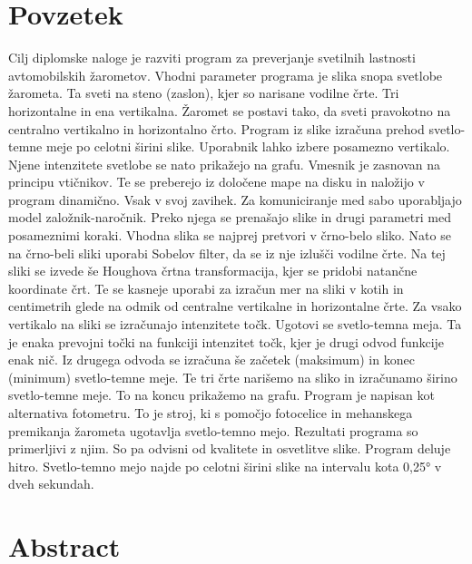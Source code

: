 \documentclass[oneside, a4paper, 12pt]{book}
\newcommand{\clearemptydoublepage}{\newpage{\pagestyle{empty}\cleardoublepage}}
\begin{document}
\chapter*{Povzetek}
\chaptermark{}
Cilj diplomske naloge je razviti program za preverjanje svetilnih 
lastnosti avtomobilskih žarometov. Vhodni parameter programa je slika 
snopa svetlobe žarometa. Ta sveti na steno (zaslon), kjer so narisane 
vodilne črte. Tri horizontalne in ena vertikalna. Žaromet se postavi 
tako, da sveti pravokotno na centralno vertikalno in horizontalno črto. 
Program iz slike izračuna prehod svetlo-temne meje po celotni širini 
slike. Uporabnik lahko izbere posamezno vertikalo. Njene intenzitete 
svetlobe se nato prikažejo na grafu. Vmesnik je zasnovan na principu 
vtičnikov. Te se preberejo iz določene mape na disku in naložijo v 
program dinamično. Vsak v svoj zavihek. Za komuniciranje med sabo 
uporabljajo model založnik-naročnik. Preko njega se prenašajo slike 
in drugi parametri med posameznimi koraki. Vhodna slika se najprej 
pretvori v črno-belo sliko. Nato se na črno-beli sliki uporabi Sobelov 
filter, da se iz nje izlušči vodilne črte. Na tej sliki se izvede še 
Houghova črtna transformacija, kjer se pridobi natančne koordinate črt. 
Te se kasneje uporabi za izračun mer na sliki v kotih in centimetrih 
glede na odmik od centralne vertikalne in horizontalne črte. Za vsako 
vertikalo na sliki se izračunajo intenzitete točk. Ugotovi se svetlo-temna 
meja. Ta je enaka prevojni točki na funkciji intenzitet točk, kjer je 
drugi odvod funkcije enak nič. Iz drugega odvoda se izračuna še začetek 
(maksimum) in konec (minimum) svetlo-temne meje. Te tri črte narišemo na 
sliko in izračunamo širino svetlo-temne meje. To na koncu prikažemo na 
grafu. Program je napisan kot alternativa fotometru. To je stroj, ki s 
pomočjo fotocelice in mehanskega premikanja žarometa ugotavlja svetlo-temno 
mejo. Rezultati programa so primerljivi z njim. So pa odvisni 
od kvalitete in osvetlitve slike. Program deluje hitro. Svetlo-temno 
mejo najde po celotni širini slike na intervalu kota 0,25° v dveh sekundah.
\clearemptydoublepage

\chapter*{Abstract}
\end{document}
